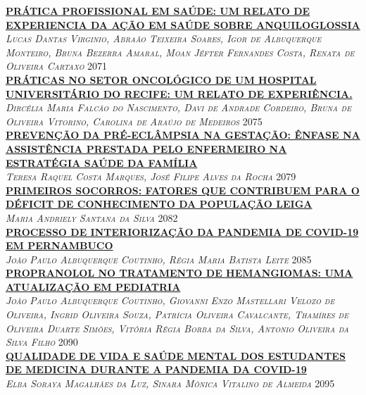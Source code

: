 \noindent \textsc{\hyperlink{trabalhos/248859.pdf.1}{\textbf{PRÁTICA PROFISSIONAL EM SAÚDE: UM RELATO DE EXPERIENCIA DA AÇÃO EM SAÚDE SOBRE ANQUILOGLOSSIA}}}\\ 
\noindent \textsc{\textit{Lucas Dantas Virginio, Abraão Teixeira Soares, Igor de Albuquerque Monteiro, Bruna Bezerra Amaral, Moan Jéfter Fernandes Costa, Renata de Oliveira Cartaxo}} \hfill 2071\\ 

\noindent \textsc{\hyperlink{trabalhos/250118.pdf.1}{\textbf{PRÁTICAS NO SETOR ONCOLÓGICO DE UM HOSPITAL UNIVERSITÁRIO DO RECIFE: UM RELATO DE EXPERIÊNCIA.}}}\\ 
\noindent \textsc{\textit{Dircélia Maria Falcão do Nascimento, Davi de Andrade Cordeiro, Bruna de Oliveira Vitorino, Carolina de Araújo de Medeiros}} \hfill 2075\\ 

\noindent \textsc{\hyperlink{trabalhos/247506.pdf.1}{\textbf{PREVENÇÃO DA PRÉ-ECLÂMPSIA NA GESTAÇÃO: ÊNFASE NA ASSISTÊNCIA PRESTADA PELO ENFERMEIRO NA ESTRATÉGIA SAÚDE DA FAMÍLIA  }}}\\ 
\noindent \textsc{\textit{Teresa Raquel Costa Marques, José Filipe Alves da Rocha}} \hfill 2079\\ 

\noindent \textsc{\hyperlink{trabalhos/249741.pdf.1}{\textbf{PRIMEIROS SOCORROS: FATORES QUE CONTRIBUEM PARA O DÉFICIT DE CONHECIMENTO DA POPULAÇÃO LEIGA}}}\\ 
\noindent \textsc{\textit{Maria Andriely Santana da Silva}} \hfill 2082\\ 

\noindent \textsc{\hyperlink{trabalhos/250087.pdf.1}{\textbf{PROCESSO DE INTERIORIZAÇÃO DA PANDEMIA DE COVID-19 EM PERNAMBUCO}}}\\ 
\noindent \textsc{\textit{João Paulo Albuquerque Coutinho, Régia Maria Batista Leite}} \hfill 2085\\ 

\noindent \textsc{\hyperlink{trabalhos/250113.pdf.1}{\textbf{PROPRANOLOL NO TRATAMENTO DE HEMANGIOMAS: UMA ATUALIZAÇÃO EM PEDIATRIA}}}\\ 
\noindent \textsc{\textit{João Paulo Albuquerque Coutinho, Giovanni Enzo Mastellari Velozo de Oliveira, Ingrid Oliveira Souza, Patrícia Oliveira Cavalcante, Thamíres de Oliveira Duarte Simões, Vitória Régia Borba da Silva, Antonio Oliveira da Silva Filho}} \hfill 2090\\ 

\noindent \textsc{\hyperlink{trabalhos/249940.pdf.1}{\textbf{QUALIDADE DE VIDA E SAÚDE MENTAL DOS ESTUDANTES DE MEDICINA DURANTE A PANDEMIA DA COVID-19}}}\\ 
\noindent \textsc{\textit{Elba Soraya Magalhães da Luz, Sinara Mônica Vitalino de Almeida}} \hfill 2095\\ 

